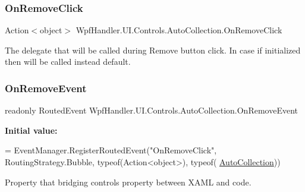 \subsubsection{\texorpdfstring{On\+Remove\+Click}{OnRemoveClick}}
{\footnotesize\ttfamily Action$<$object$>$ Wpf\+Handler.\+U\+I.\+Controls.\+Auto\+Collection.\+On\+Remove\+Click}



The delegate that will be called during Remove button click. In case if initialized then will be called instead default. 

\mbox{\label{class_wpf_handler_1_1_u_i_1_1_controls_1_1_auto_collection_a55213a701b1defa4c6a490d25f083fe4}} 
\subsubsection{\texorpdfstring{On\+Remove\+Event}{OnRemoveEvent}}
{\footnotesize\ttfamily readonly Routed\+Event Wpf\+Handler.\+U\+I.\+Controls.\+Auto\+Collection.\+On\+Remove\+Event\hspace{0.3cm}{\ttfamily [static]}}

{\bfseries Initial value\+:}
\begin{DoxyCode}
= EventManager.RegisterRoutedEvent(\textcolor{stringliteral}{"OnRemoveClick"},
            RoutingStrategy.Bubble, typeof(Action<object>), typeof(
      \mbox{\hyperlink{class_wpf_handler_1_1_u_i_1_1_controls_1_1_auto_collection_a8bc71a7c43dfeca1d6ff113b12088c28}{AutoCollection}}))
\end{DoxyCode}


Property that bridging control\textquotesingle{}s property between X\+A\+ML and code. 

\mbox{\label{class_wpf_handler_1_1_u_i_1_1_controls_1_1_auto_collection_a85a427be17693babbaa5943c04c2ca2d}} 
